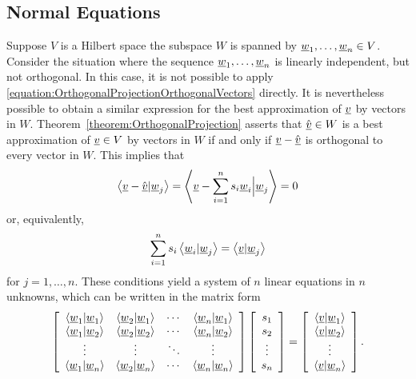 \subsection{Normal Equations}

Suppose $V$ is a Hilbert space the subspace $W$ is spanned by $\underline{w}_1, \ldots, \underline{w}_n \in V$.
Consider the situation where the sequence $\underline{w}_1, \ldots, \underline{w}_n$ is linearly independent, but not orthogonal.
In this case, it is not possible to apply \eqref{equation:OrthogonalProjectionOrthogonalVectors} directly.
It is nevertheless possible to obtain a similar expression for the best approximation of $\underline{v}$ by vectors in $W$.
Theorem~\ref{theorem:OrthogonalProjection} asserts that $\hat{\underline{v}} \in W$ is a best approximation of $\underline{v} \in V$ by vectors in $W$ if and only if $\underline{v} - \hat{\underline{v}}$ is orthogonal to every vector in $W$.
This implies that
\begin{equation*}
\left\langle \underline{v} - \hat{\underline{v}} | \underline{w}_j \right\rangle
= \left\langle \underline{v} - \sum_{i=1}^n s_i \underline{w}_i \Big| \underline{w}_j \right\rangle
= 0
\end{equation*}
or, equivalently,
\begin{equation*}
\sum_{i=1}^n s_i \left\langle \underline{w}_i | \underline{w}_j \right\rangle
= \left\langle \underline{v} | \underline{w}_j \right\rangle
\end{equation*}
for $j = 1, \ldots, n$.
These conditions yield a system of $n$ linear equations in $n$ unknowns, which can be written in the matrix form
\begin{equation*}
\left[ \begin{array}{cccc}
\left\langle \underline{w}_1 | \underline{w}_1 \right\rangle
& \left\langle \underline{w}_2 | \underline{w}_1 \right\rangle & \cdots
& \left\langle \underline{w}_n | \underline{w}_1 \right\rangle \\
\left\langle \underline{w}_1 | \underline{w}_2 \right\rangle
& \left\langle \underline{w}_2 | \underline{w}_2 \right\rangle & \cdots
& \left\langle \underline{w}_n | \underline{w}_2 \right\rangle \\
\vdots & \vdots & \ddots & \vdots \\
\left\langle \underline{w}_1 | \underline{w}_n \right\rangle
& \left\langle \underline{w}_2 | \underline{w}_n \right\rangle & \cdots
& \left\langle \underline{w}_n | \underline{w}_n \right\rangle
\end{array} \right]
\left[ \begin{array}{c}
s_1 \\ s_2 \\ \vdots \\ s_n \end{array} \right]
= \left[ \begin{array}{c}
\left\langle \underline{v} | \underline{w}_1 \right\rangle \\
\left\langle \underline{v} | \underline{w}_2 \right\rangle \\ \vdots \\
\left\langle \underline{v} | \underline{w}_n \right\rangle \end{array} \right] .
\end{equation*}
